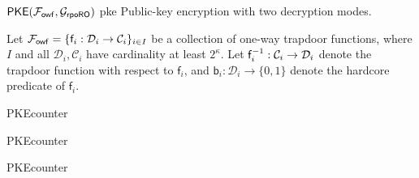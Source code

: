 \begin{cccAlgorithm}
    {$\mathsf{PKE}(\mathcal{F}_{\mathsf{owf}}, \mathcal{G}_{\mathsf{rpoRO}})$}
    {pke}
    {Public-key encryption with two decryption modes.}

	Let $\mathcal{F}_{\mathsf{owf}} = \{ \mathsf{f}_i : \mathcal{D}_i \rightarrow \mathcal{C}_i\}_{i \in I}$ be a collection of one-way trapdoor functions, where $I$ and all $\mathcal{D}_i, \mathcal{C}_i$ have cardinality at least $2^\kappa$.
	Let $\mathsf{f}^{-1}_i : \mathcal{C}_i \rightarrow \mathcal{D}_i$ denote the trapdoor function with respect to $\mathsf{f}_i$, and $\mathsf{b}_i: \mathcal{D}_i \rightarrow \{0, 1\}$ denote the hardcore predicate of $\mathsf{f}_i$.

	\medskip

	\begin{minipage}[t]{.49\textwidth}
		\begin{algorithmWithNumbering}{PKEcounter}
		\end{algorithmWithNumbering}

		\medskip

		\begin{algorithmWithNumbering}{PKEcounter}
			\EndFor
		\end{algorithmWithNumbering}
	\end{minipage}
	\begin{minipage}[t]{.49\textwidth}
		\begin{algorithmWithNumbering}{PKEcounter}

			\EndFor
		\end{algorithmWithNumbering}


\end{minipage}
\end{cccAlgorithm}
